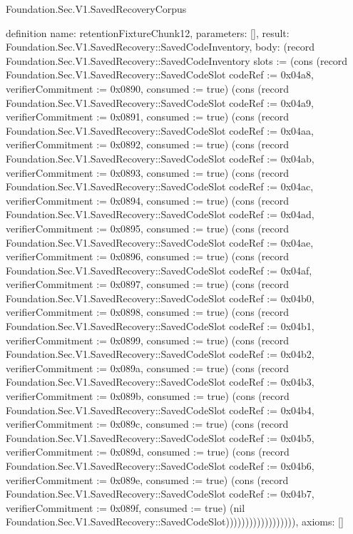 \begin{lexlean}{Foundation.Sec.V1.SavedRecoveryCorpus}
\begin{semanticmodule}
definition{
  name: retentionFixtureChunk12,
  parameters: [],
  result: Foundation.Sec.V1.SavedRecovery::SavedCodeInventory,
  body: (record Foundation.Sec.V1.SavedRecovery::SavedCodeInventory {slots := (cons (record Foundation.Sec.V1.SavedRecovery::SavedCodeSlot {codeRef := 0x04a8, verifierCommitment := 0x0890, consumed := true}) (cons (record Foundation.Sec.V1.SavedRecovery::SavedCodeSlot {codeRef := 0x04a9, verifierCommitment := 0x0891, consumed := true}) (cons (record Foundation.Sec.V1.SavedRecovery::SavedCodeSlot {codeRef := 0x04aa, verifierCommitment := 0x0892, consumed := true}) (cons (record Foundation.Sec.V1.SavedRecovery::SavedCodeSlot {codeRef := 0x04ab, verifierCommitment := 0x0893, consumed := true}) (cons (record Foundation.Sec.V1.SavedRecovery::SavedCodeSlot {codeRef := 0x04ac, verifierCommitment := 0x0894, consumed := true}) (cons (record Foundation.Sec.V1.SavedRecovery::SavedCodeSlot {codeRef := 0x04ad, verifierCommitment := 0x0895, consumed := true}) (cons (record Foundation.Sec.V1.SavedRecovery::SavedCodeSlot {codeRef := 0x04ae, verifierCommitment := 0x0896, consumed := true}) (cons (record Foundation.Sec.V1.SavedRecovery::SavedCodeSlot {codeRef := 0x04af, verifierCommitment := 0x0897, consumed := true}) (cons (record Foundation.Sec.V1.SavedRecovery::SavedCodeSlot {codeRef := 0x04b0, verifierCommitment := 0x0898, consumed := true}) (cons (record Foundation.Sec.V1.SavedRecovery::SavedCodeSlot {codeRef := 0x04b1, verifierCommitment := 0x0899, consumed := true}) (cons (record Foundation.Sec.V1.SavedRecovery::SavedCodeSlot {codeRef := 0x04b2, verifierCommitment := 0x089a, consumed := true}) (cons (record Foundation.Sec.V1.SavedRecovery::SavedCodeSlot {codeRef := 0x04b3, verifierCommitment := 0x089b, consumed := true}) (cons (record Foundation.Sec.V1.SavedRecovery::SavedCodeSlot {codeRef := 0x04b4, verifierCommitment := 0x089c, consumed := true}) (cons (record Foundation.Sec.V1.SavedRecovery::SavedCodeSlot {codeRef := 0x04b5, verifierCommitment := 0x089d, consumed := true}) (cons (record Foundation.Sec.V1.SavedRecovery::SavedCodeSlot {codeRef := 0x04b6, verifierCommitment := 0x089e, consumed := true}) (cons (record Foundation.Sec.V1.SavedRecovery::SavedCodeSlot {codeRef := 0x04b7, verifierCommitment := 0x089f, consumed := true}) (nil Foundation.Sec.V1.SavedRecovery::SavedCodeSlot)))))))))))))))))}),
  axioms: []
}


\end{semanticmodule}
\end{lexlean}
